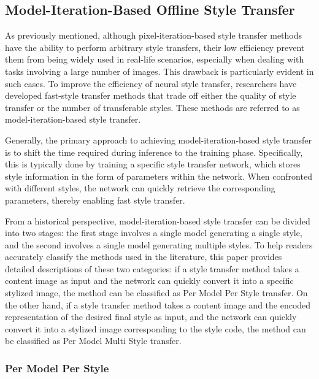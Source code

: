\subsection{Model-Iteration-Based Offline Style Transfer}

As previously mentioned, although pixel-iteration-based style transfer methods have the ability to perform arbitrary style transfers, their low efficiency prevent them from being widely used in real-life scenarios, especially when dealing with tasks involving a large number of images. This drawback is particularly evident in such cases. To improve the efficiency of neural style transfer, researchers have developed fast-style transfer methods that trade off either the quality of style transfer or the number of transferable styles. These methods are referred to as model-iteration-based style transfer.

Generally, the primary approach to achieving model-iteration-based style transfer is to shift the time required during inference to the training phase. Specifically, this is typically done by training a specific style transfer network, which stores style information in the form of parameters within the network. When confronted with different styles, the network can quickly retrieve the corresponding parameters, thereby enabling fast style transfer.

From a historical perspective, model-iteration-based style transfer can be divided into two stages: the first stage involves a single model generating a single style, and the second involves a single model generating multiple styles. To help readers accurately classify the methods used in the literature, this paper provides detailed descriptions of these two categories: if a style transfer method takes a content image as input and the network can quickly convert it into a specific stylized image, the method can be classified as Per Model Per Style transfer. On the other hand, if a style transfer method takes a content image and the encoded representation of the desired final style as input, and the network can quickly convert it into a stylized image corresponding to the style code, the method can be classified as Per Model Multi Style transfer. 

\subsubsection{Per Model Per Style}

